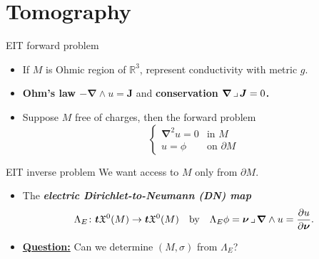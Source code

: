 \documentclass[aspectratio=169,handout]{beamer}
\newcommand\boldgreen[1]{\textcolor{lighter_csu_green}{\emph{\textbf{#1}}}}
\newcommand\boldgold[1]{\textcolor{csu_gold}{\textbf{#1}}}
\newcommand{\tangentpart}{\boldsymbol{t}}
\newcommand{\R}{\mathbb{R}}
\newcommand{\grad}{\boldsymbol{\nabla}}
\newcommand{\blade}[1]{\boldsymbol{#1}}
\newcommand{\boundary}{{\partial M}}
\newcommand{\normal}{\blade{\nu}}
\newcommand{\contract}{\hspace*{.5mm} \lrcorner \hspace*{.5mm}}
\newcommand{\smoothfields}{\mathfrak{X}}
\begin{document}
\section{Tomography}


\begin{frame}{EIT forward problem}
\vfill
\begin{itemize}
\pause
\item If $M$ is Ohmic region of $\R^3$, represent conductivity with metric $g$.
\pause
\item \boldgold{Ohm's law $-\grad\wedge u =\blade{J}$} and \boldgold{conservation $\grad \contract \blade{J}=0$.}
\pause
\item Suppose $M$ free of charges, then the forward problem
\[
\begin{cases}
\grad^2 u = 0 & \textrm{in $M$}\\
u = \phi & \textrm{on $\partial M$}
\end{cases}
\]
\pause
\end{itemize}
\vfill
\end{frame}

\begin{frame}{EIT inverse problem}
\vfill
\pause
We want access to $M$ only from $\boundary$.
\begin{itemize}
\pause
\item The \boldgreen{electric Dirichlet-to-Neumann (DN) map}
\[
\Lambda_E \colon \tangentpart \smoothfields^0(M) \to \tangentpart \smoothfields^0(M) \quad \textrm{by} \quad  \Lambda_E\phi = \normal \contract \grad \wedge u = \frac{\partial u}{\partial \normal}.
\]
\pause
\item \textbf{\underline{Question:}} Can we determine $(M,\sigma)$ from $\Lambda_E$?
\end{itemize}
\vfill
\end{frame}
\end{document}
